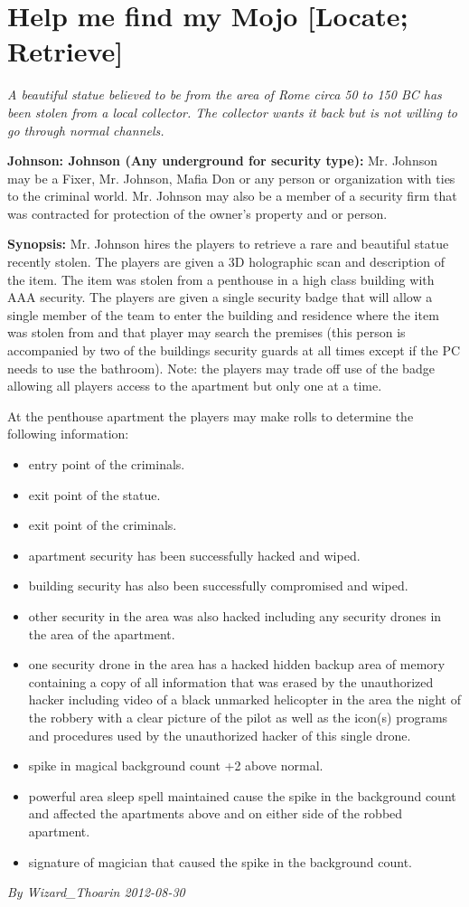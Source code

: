 \documentclass[letterpaper,twocolumn,10.5pt]{article}
\newenvironment{scenario}[6]
	{
		\section{#1 {\small[#2]}}
		\textit{#3}
		\def\TMPSCENARIO{#4 #5}
	}
	{\small\textit{By \TMPSCENARIO}}
\newcommand{\johnson}[2]{\textbf{Johnson: #1 (#2):}}
\newcommand{\synopsis}{\textbf{Synopsis: }}
\begin{document}
\begin{scenario}{Help me find my Mojo}
	{Locate; Retrieve}
	{ A beautiful statue believed to be from the area of Rome circa 50 to 150 BC has been stolen from a local collector. The collector wants it back but is not willing to go through normal channels.}
	{Wizard\_Thoarin}
	{2012-08-30}
	{https://forum.rpg.net/showthread.php?321504-Shadowrun-4th-101-Instant-Scenarios\&p=15839760#post15839760}

\johnson{Johnson}{Any underground for security type} 
 Mr. Johnson may be a Fixer, Mr. Johnson, Mafia Don or any person or organization with ties to the criminal world. Mr. Johnson may also be a member of a security firm that was contracted for protection of the owner's property and or person.

\synopsis
 Mr. Johnson hires the players to retrieve a rare and beautiful statue recently stolen. The players are given a 3D holographic scan and description of the item. The item was stolen from a penthouse in a high class building with AAA security. The players are given a single security badge that will allow a single member of the team to enter the building and residence where the item was stolen from and that player may search the premises (this person is accompanied by two of the buildings security guards at all times except if the PC needs to use the bathroom). Note: the players may trade off use of the badge allowing all players access to the apartment but only one at a time.

At the penthouse apartment the players may make rolls to determine the following information:

\begin{itemize}
\item    entry point of the criminals.
\item    exit point of the statue.
\item    exit point of the criminals.
\item    apartment security has been successfully hacked and wiped.
\item    building security has also been successfully compromised and wiped.
\item    other security in the area was also hacked including any security drones in the area of the apartment.
\item    one security drone in the area has a hacked hidden backup area of memory containing a copy of all information that was erased by the unauthorized hacker including video of a black unmarked helicopter in the area the night of the robbery with a clear picture of the pilot as well as the icon(s) programs and procedures used by the unauthorized hacker of this single drone.
\item    spike in magical background count +2 above normal.
\item    powerful area sleep spell maintained cause the spike in the background count and affected the apartments above and on either side of the robbed apartment.
\item    signature of magician that caused the spike in the background count.
\end{itemize}



\end{scenario}
\end{document}
